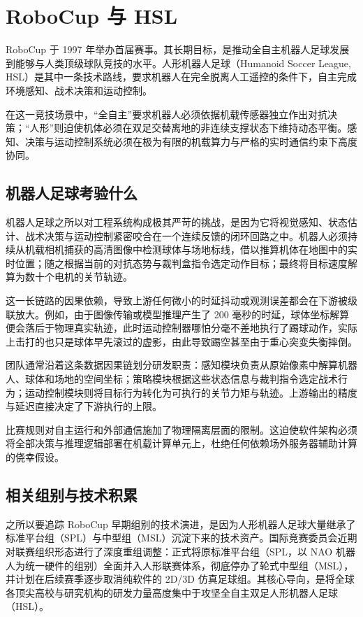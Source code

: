 \section{RoboCup 与 HSL}

RoboCup 于 1997 年举办首届赛事。其长期目标，是推动全自主机器人足球发展到能够与人类顶级球队竞技的水平。人形机器人足球（Humanoid Soccer League, HSL）是其中一条技术路线，要求机器人在完全脱离人工遥控的条件下，自主完成环境感知、战术决策和运动控制。\official

在这一竞技场景中，“全自主”要求机器人必须依据机载传感器独立作出对抗决策；“人形”则迫使机体必须在双足交替离地的非连续支撑状态下维持动态平衡。感知、决策与运动控制系统必须在极为有限的机载算力与严格的实时通信约束下高度协同。

\subsection{机器人足球考验什么}

机器人足球之所以对工程系统构成极其严苛的挑战，是因为它将视觉感知、状态估计、战术决策与运动控制紧密咬合在一个连续反馈的闭环回路之中。机器人必须持续从机载相机捕获的高清图像中检测球体与场地标线，借以推算机体在地图中的实时位置；随之根据当前的对抗态势与裁判盒指令选定动作目标；最终将目标速度解算为数十个电机的关节轨迹。

这一长链路的因果依赖，导致上游任何微小的时延抖动或观测误差都会在下游被级联放大。例如，由于图像传输或模型推理产生了 200 毫秒的时延，球体坐标解算便会落后于物理真实轨迹，此时运动控制器哪怕分毫不差地执行了踢球动作，实际上击打的也只是球体早先滚过的虚影，由此导致踢空甚至由于重心突变失衡摔倒。

团队通常沿着这条数据因果链划分研发职责：感知模块负责从原始像素中解算机器人、球体和场地的空间坐标；策略模块根据这些状态信息与裁判指令选定战术行为；运动控制模块则将目标行为转化为可执行的关节力矩与轨迹。上游输出的精度与延迟直接决定了下游执行的上限。

比赛规则对自主运行和外部通信施加了物理隔离层面的限制。这迫使软件架构必须将全部决策与推理逻辑部署在机载计算单元上，杜绝任何依赖场外服务器辅助计算的侥幸假设。

\subsection{相关组别与技术积累}

之所以要追踪 RoboCup 早期组别的技术演进，是因为人形机器人足球大量继承了标准平台组（SPL）与中型组（MSL）沉淀下来的技术资产。国际竞赛委员会近期对联赛组织形态进行了深度重组调整：正式将原标准平台组（SPL，以 NAO 机器人为统一硬件的组别）全面并入人形联赛体系，彻底停办了轮式中型组（MSL），并计划在后续赛季逐步取消纯软件的 2D/3D 仿真足球组。其核心导向，是将全球各顶尖高校与研究机构的研发力量高度集中于攻坚全自主双足人形机器人足球（HSL）。

